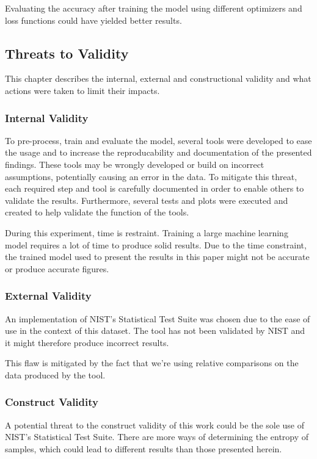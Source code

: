 \documentclass[conference]{IEEEtran}
\begin{document}
Evaluating the accuracy after training the model using different optimizers and loss functions could have yielded better results.

\subsection{Threats to Validity}
This chapter describes the internal, external and constructional validity and what actions were taken to limit their impacts.

\subsubsection{Internal Validity}
To pre-process, train and evaluate the model, several tools were developed to ease the usage and to increase the reproducability and documentation of the presented findings. These tools may be wrongly developed or build on incorrect assumptions, potentially causing an error in the data. To mitigate this threat, each required step and tool is carefully documented in order to enable others to validate the results. Furthermore, several tests and plots were executed and created to help validate the function of the tools.

During this experiment, time is restraint. Training a large machine learning model requires a lot of time to produce solid results. Due to the time constraint, the trained model used to present the results in this paper might not be accurate or produce accurate figures.

\subsubsection{External Validity}
An implementation of NIST's Statistical Test Suite was chosen due to the ease of use in the context of this dataset. The tool has not been validated by NIST and it might therefore produce incorrect results.

This flaw is mitigated by the fact that we're using relative comparisons on the data produced by the tool.

\subsubsection{Construct Validity}
A potential threat to the construct validity of this work could be the sole use of NIST's Statistical Test Suite. There are more ways of determining the entropy of samples, which could lead to different results than those presented herein.
\end{document}
